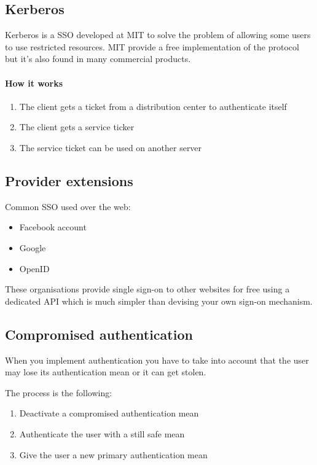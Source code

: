 \subsection{Kerberos}
Kerberos is a SSO developed at MIT to solve the problem of allowing
some users to use restricted resources. MIT provide a free
implementation of the protocol but it's also found in many commercial
products.

\paragraph{How it works}
\begin{enumerate}
\item The client gets a ticket from a distribution center to authenticate itself
\item The client gets a service ticker
\item The service ticket can be used on another server
\end{enumerate}

\subsection{Provider extensions}
Common SSO used over the web:
\begin{itemize}
\item Facebook account
\item Google
\item OpenID
\end{itemize}
These organisations provide single sign-on to other websites for free
using a dedicated API which is much simpler than devising your own
sign-on mechanism.

\subsection{Compromised authentication}
When you implement authentication you have to take into account that the user
may lose its authentication mean or it can get stolen.

The process is the following:
\begin{enumerate}
\item Deactivate a compromised authentication mean
\item Authenticate the user with a still safe mean
\item Give the user a new primary authentication mean
\end{enumerate}

